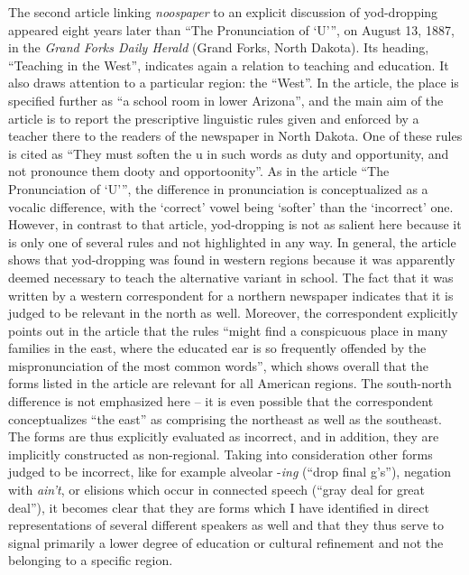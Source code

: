 The second article linking \emph{noospaper} to an explicit discussion of yod-dropping appeared eight years later than “The Pronunciation of ‘U’”, on August 13, 1887, in the \emph{Grand Forks Daily Herald} (Grand Forks, North Dakota). Its heading, “Teaching in the West”, indicates again a relation to teaching and education. It also draws attention to a particular region: the “West”. In the article, the place is specified further as “a school room in lower Arizona”, and the main aim of the article is to report the prescriptive linguistic rules given and enforced by a teacher there to the readers of the newspaper in North Dakota. One of these rules is cited as “They must soften the u in such words as duty and opportunity, and not pronounce them dooty and opportoonity”. As in the article “The Pronunciation of ‘U’”, the difference in pronunciation is conceptualized as a vocalic difference, with the ‘correct’ vowel being ‘softer’ than the ‘incorrect’ one. However, in contrast to that article, yod-dropping is not as salient here because it is only one of several rules and not highlighted in any way. In general, the article shows that yod-dropping was found in western regions because it was apparently deemed necessary to teach the alternative variant in school. The fact that it was written by a western correspondent for a northern newspaper indicates that it is judged to be relevant in the north as well. Moreover, the correspondent explicitly points out in the article that the rules “might find a conspicuous place in many families in the east, where the educated ear is so frequently offended by the mispronunciation of the most common words”, which shows overall that the forms listed in the article are relevant for all American regions. The south-north difference is not emphasized here – it is even possible that the correspondent conceptualizes “the east” as comprising the northeast as well as the southeast. The forms are thus explicitly evaluated as incorrect, and in addition, they are implicitly constructed as non-regional. Taking into consideration other forms judged to be incorrect, like for example alveolar -\emph{ing} (“drop final g’s”), negation with \emph{ain’t}, or elisions which occur in connected speech (“gray deal for great deal”), it becomes clear that they are forms which I have identified in direct representations of several different speakers as well and that they thus serve to signal primarily a lower degree of education or cultural refinement and not the belonging to a specific region.


